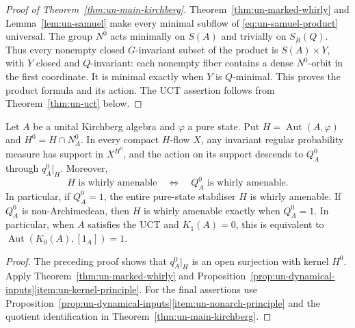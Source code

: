 \begin{proof}[Proof of Theorem~\ref{thm:un-main-kirchberg}]
Theorem~\ref{thm:un-marked-whirly} and Lemma~\ref{lem:un-samuel} make every
minimal subflow of \eqref{eq:un-samuel-product} universal.
The group \(N^0\) acts minimally on \(S(A)\) and trivially on
\(S_R(Q)\). Thus every nonempty closed \(G\)-invariant subset of
the product is \(S(A)\times Y\), with \(Y\) closed and
\(Q\)-invariant: each nonempty fiber contains a dense \(N^0\)-orbit
in the first coordinate. It is minimal exactly when \(Y\) is
\(Q\)-minimal. This proves the product formula and its action.
The UCT assertion follows from Theorem~\ref{thm:un-uct} below.
\end{proof}

\begin{corollary}\label{cor:un-marked-measures}
Let \(A\) be a unital Kirchberg algebra and \(\varphi\) a pure state.
Put \(H=\operatorname{Aut}(A,\varphi)\) and \(H^0=H\cap N_A^0\).
In every compact \(H\)-flow \(X\), any invariant regular probability
measure has support in \(X^{H^0}\), and the action on its support
descends to \(Q_A^0\) through \(q_A^0|_H\). Moreover,
\[
 H\text{ is whirly amenable}
 \quad\Longleftrightarrow\quad Q_A^0\text{ is whirly amenable}.
\]
In particular, if \(Q_A^0=1\), the entire pure-state stabiliser \(H\)
is whirly amenable.
If \(Q_A^0\) is non-Archimedean, then \(H\) is whirly amenable
exactly when \(Q_A^0=1\). In particular, when \(A\) satisfies the UCT
and \(K_1(A)=0\), this is equivalent to
\(\operatorname{Aut}(K_0(A),[1_A])=1\).
\end{corollary}
\begin{proof}
The preceding proof shows that \(q_A^0|_H\) is an open surjection
with kernel \(H^0\). Apply Theorem~\ref{thm:un-marked-whirly} and
Proposition~\ref{prop:un-dynamical-inputs}\ref{item:un-kernel-principle}.
For the final assertions use Proposition~\ref{prop:un-dynamical-inputs}\ref{item:un-nonarch-principle} and the
quotient identification in Theorem~\ref{thm:un-main-kirchberg}.
\end{proof}

